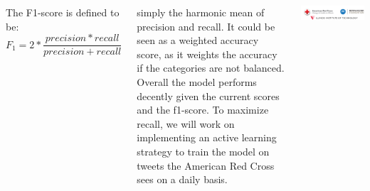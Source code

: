 \documentclass[
blockverticalspace=-0.75cm
]{tikzposter}
\begin{document}
\begin{columns}
{{        \vspace{0.5 cm}
        The F1-score is defined to be:
        \begin{equation}
            F_1 = 2 * \frac{precision * recall}{precision+recall}
        \end{equation}
        \vspace{0.5 cm}
        
        simply the harmonic mean of precision and recall. It could be seen as a weighted accuracy score, as it weights the accuracy if the categories are not balanced. Overall the model performs decently given the current scores and the f1-score. To maximize recall, we will work on implementing an active learning strategy to train the model on tweets the American Red Cross sees on a daily basis.
        }
    }
    
    
    
    \block{}%
    {
        \vspace{-2.25cm}
        \begin{tikzfigure}
        \includegraphics[scale=0.50]{Poster_Pics/Logos.png}
        \end{tikzfigure} 
    }

    
\end{columns}
\end{document}
